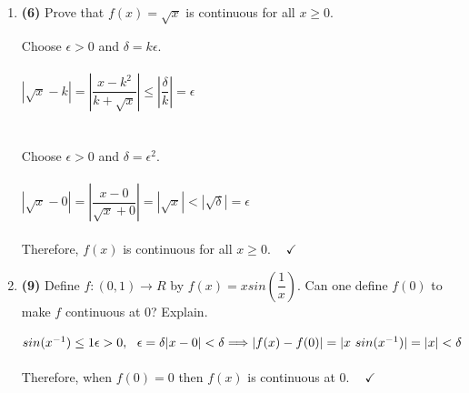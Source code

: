\documentclass[fleqn]{article}
\begin{document}
\begin{enumerate}
    \item \textbf{(6)} Prove that $f(x)=\sqrt{x}$ is continuous for all $x \geq 0$.

      \textcolor{hwColor}{
        Choose $\epsilon > 0$ and $\delta=k \epsilon$.
        \\
        \\
        $
          |\sqrt{x}-k|=|\dfrac{x-k^2}{k+\sqrt{x}}| \leq |\dfrac{\delta}{k}|=\epsilon
        $
        \\
        \\
        \\
        Choose $\epsilon > 0$ and $\delta=\epsilon^2$.
        \\
        \\
        $
          |\sqrt{x}-0|=|\dfrac{x-0}{\sqrt{x}+0}|=|\sqrt{x}| < |\sqrt{\delta}|=\epsilon
        $
        \\
        \\
        Therefore, $f(x)$ is continuous for all $x \geq 0$. $~~~~ \checkmark$
      }
    

    \item \textbf{(9)} Define $f: (0, 1) \longrightarrow R$ by $f(x)=x sin(\dfrac{1}{x})$. Can one define
    $f(0)$ to make $f$ continuous at $0$? Explain.

      \textcolor{hwColor}{
        $
          sin(x^{-1}) \leq 1
          \\
          \\
          \\
          \epsilon > 0, ~~ \epsilon=\delta
          \\
          \\
          |x-0| < \delta \Longrightarrow |f(x)-f(0)|=|x ~ sin(x^{-1})|=|x| < \delta
        $
        \\
        \\
        Therefore, when $f(0)=0$ then $f(x)$ is continuous at $0$. $~~~~ \checkmark$
        \\
        \\
      }

  \end{enumerate}  
\end{document}
